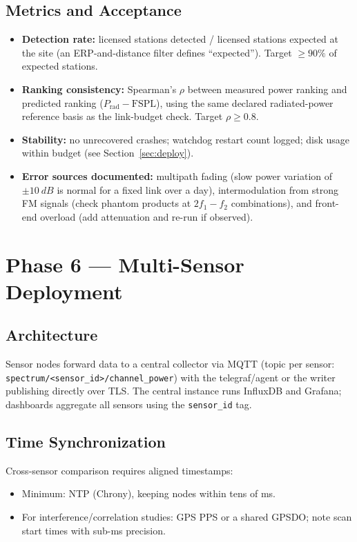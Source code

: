 \documentclass[12pt,a4paper]{report}
\begin{document}
 \subsection*{Metrics and Acceptance}
 \begin{itemize}
 	\item \textbf{Detection rate:} licensed stations detected / licensed
 	stations expected at the site (an ERP-and-distance filter defines
 	``expected''). Target $\ge 90\%$ of expected stations.
 	\item \textbf{Ranking consistency:} Spearman's $\rho$ between measured
 	power ranking and predicted ranking
 	($P_{\text{rad}} - \text{FSPL}$), using the same declared radiated-power reference basis as the link-budget check. Target $\rho \ge 0.8$.
 	\item \textbf{Stability:} no unrecovered crashes; watchdog restart count
 	logged; disk usage within budget (see Section~\ref{sec:deploy}).
 	\item \textbf{Error sources documented:} multipath fading (slow power
 	variation of $\pm \SI{10}{dB}$ is normal for a fixed link over a day),
 	intermodulation from strong FM signals (check phantom products at
 	$2f_1-f_2$ combinations), and front-end overload (add attenuation and
 	re-run if observed).
 \end{itemize}
 \section{Phase 6 --- Multi-Sensor Deployment}
 \subsection*{Architecture}
 Sensor nodes forward data to a central collector via MQTT (topic per sensor:
 \texttt{spectrum/<sensor\_id>/channel\_power}) with the telegraf/agent or the
 writer publishing directly over TLS. The central instance runs InfluxDB and
 Grafana; dashboards aggregate all sensors using the \texttt{sensor\_id} tag.
 \subsection*{Time Synchronization}
 Cross-sensor comparison requires aligned timestamps:
 \begin{itemize}
 	\item Minimum: NTP (Chrony), keeping nodes within tens of ms.
 	\item For interference/correlation studies: GPS PPS or a shared GPSDO;
 	note scan start times with sub-ms precision.
 \end{itemize}
\end{document}

